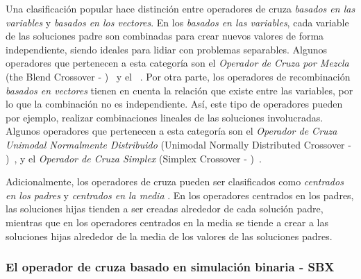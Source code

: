 Una clasificación popular hace distinción entre operadores de cruza \textit{basados en las variables} y \textit{basados en los vectores}.
%
En los \textit{basados en las variables}, cada variable de las soluciones padre son combinadas para crear nuevos valores de 
forma independiente, siendo ideales para
lidiar con problemas separables.
%
Algunos operadores que pertenecen a esta categoría son el \textit{Operador de Cruza por Mezcla} (the Blend Crossover - \BLX{})~\cite{eshelman1993real} 
y el \SBX~\cite{Joel:SBX1994}.
%
Por otra parte, los operadores de recombinación \textit{basados en vectores} tienen en cuenta la relación que existe entre las variables, por lo que
la combinación no es independiente.
%
Así, este tipo de operadores pueden por ejemplo, realizar combinaciones lineales de las soluciones involucradas.
%
Algunos operadores que pertenecen a esta categoría son el \textit{Operador de Cruza Unimodal Normalmente Distribuido} (Unimodal Normally Distributed Crossover - \UNDX{})~\cite{Joel:UNDX}, 
y el \textit{Operador de Cruza Simplex} (Simplex Crossover - \SPX{})~\cite{Joel:DE_Storn_SPX}.

Adicionalmente, los operadores de cruza pueden ser clasificados como \textit{centrados en los padres} y \textit{centrados en la media} \cite{jain2011parent}.
%
En los operadores centrados en los padres, las soluciones hijas tienden a ser creadas alrededor 
de cada solución padre, mientras que en los operadores centrados 
en la media se tiende a crear a las soluciones hijas alrededor de la media de los valores de las soluciones padres.

\subsubsection{El operador de cruza basado en simulación binaria - SBX}

